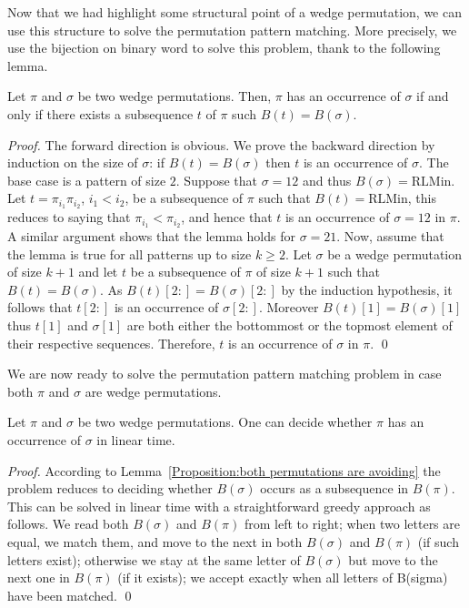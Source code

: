 \documentclass[a4paper]{llncs}
\newcommand{\RLMin}{\text{RLMin}\xspace}
\newcommand{\bijection}{B}
\begin{document}
Now that we had highlight some structural point of a wedge permutation,
we can use this structure to solve the permutation pattern matching.
More precisely, we use the bijection on binary word to solve this problem,
thank to the following lemma.

\begin{lemma}
\label{lemma:MatchStripeToPermutation}
Let $\pi$ and $\sigma$ be two wedge permutations.
Then, $\pi$ has an occurrence of $\sigma$ if and only if
there exists a subsequence $t$ of $\pi$ such $\bijection(t)=\bijection(\sigma)$.
\end{lemma}

\begin{proof} %
The forward direction is obvious.
We prove the backward direction by induction on the size of
$\sigma$: if $\bijection(t)=\bijection(\sigma)$ then $t$ is an occurrence of $\sigma$.
The base case is a pattern of size $2$.
Suppose that $\sigma = 12$ and thus $\bijection(\sigma) = \RLMin$.
Let $t = \pi_{i_1}\pi_{i_2}$, $i_1 < i_2$, be a subsequence of $\pi$
such that $\bijection(t) = \RLMin$, this reduces to saying that
$\pi_{i_1} < \pi_{i_2}$,
and hence that $t$ is an occurrence of $\sigma = 12$ in $\pi$.
A similar argument shows that the lemma holds for $\sigma = 21$.
Now, assume that the lemma is true for all patterns up to size $k \geq 2$.
Let $\sigma$ be a wedge permutation of size $k+1$ and
let $t$
be a subsequence of $\pi$ of size $k+1$ such that
$\bijection(t) = \bijection(\sigma)$.
As $\bijection(t)[2:] = \bijection(\sigma)[2:]$
by the induction hypothesis, it follows that
$t[2:]$ is an occurrence of $\sigma[2:]$.
Moreover $\bijection(t)[1] = \bijection(\sigma)[1]$
thus $t[1]$ and $\sigma[1]$ are both either the bottommost or the topmost
element of their respective sequences.
Therefore, $t$ is an occurrence of $\sigma$ in $\pi$.
\qed
\end{proof}

We are now ready to solve the permutation pattern matching problem in case
both $\pi$ and $\sigma$ are wedge permutations.

\begin{proposition}
\label{Proposition:both permutations are avoiding}
Let $\pi$ and $\sigma$ be two wedge permutations.
One can decide whether $\pi$ has an occurrence of $\sigma$ in linear time.
\end{proposition}

\begin{proof}
According to Lemma~\ref{Proposition:both permutations are avoiding} the problem reduces
to deciding whether $\bijection(\sigma)$ occurs as a subsequence in $\bijection(\pi)$.
This can be solved in linear time with a straightforward greedy approach as follows.
We read both $\bijection(\sigma)$ and $\bijection(\pi)$ from left to right;
when two letters are equal, we match them, and move to the next in both
$\bijection(\sigma)$ and $\bijection(\pi)$ (if such letters exist);
otherwise we stay at the same letter of $\bijection(\sigma)$
but move to the next one in $\bijection(\pi)$ (if it exists);
we accept exactly when all letters of B(sigma) have been matched.
\qed
\end{proof}
\end{document}
